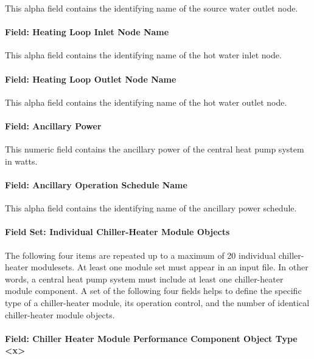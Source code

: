 This alpha field contains the identifying name of the source water outlet node.

\paragraph{Field: Heating Loop Inlet Node Name}\label{field-heating-loop-inlet-node-name}

This alpha field contains the identifying name of the hot water inlet node.

\paragraph{Field: Heating Loop Outlet Node Name}\label{field-heating-loop-outlet-node-name}

This alpha field contains the identifying name of the hot water outlet node.

\paragraph{Field: Ancillary Power}\label{field-ancillary-power-000}

This numeric field contains the ancillary power of the central heat pump system in watts.

\paragraph{Field: Ancillary Operation Schedule Name}\label{field-ancillary-operation-schedule-name}

This alpha field contains the identifying name of the ancillary power schedule.

\paragraph{Field Set: Individual Chiller-Heater Module Objects}\label{field-set-individual-chiller-heater-module-objects}

The following four items are repeated up to a maximum of 20 individual chiller-heater modulesets. At least one module set must appear in an input file. In other words, a central heat pump system must include at least one chiller-heater module component. A set of the following four fields helps to define the specific type of a chiller-heater module, its operation control, and the number of identical chiller-heater module objects.

\paragraph{Field: Chiller Heater Module Performance Component Object Type \textless{}x\textgreater{}}\label{field-chiller-heater-module-performance-component-object-type-x}


